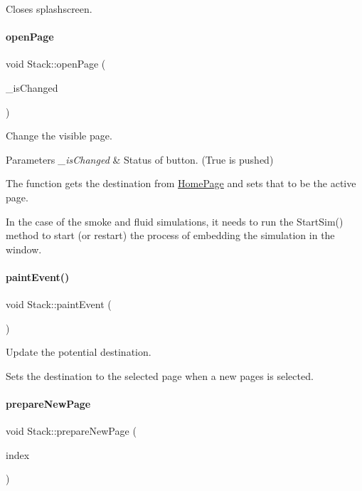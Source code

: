 Closes splashscreen. \mbox{\label{classStack_a3663db1c1578aabe63286d4f2bb6fc6f}} 
\paragraph{\texorpdfstring{openPage}{openPage}}
{\footnotesize\ttfamily void Stack\+::open\+Page (\begin{DoxyParamCaption}\item[{bool}]{\+\_\+is\+Changed }\end{DoxyParamCaption})\hspace{0.3cm}{\ttfamily [slot]}}

Change the visible page. 
\begin{DoxyParams}{Parameters}
{\em \+\_\+is\+Changed} & Status of button. (True is pushed)\\
\hline
\end{DoxyParams}
The function gets the destination from \mbox{\hyperlink{classHomePage}{Home\+Page}} and sets that to be the active page.

In the case of the smoke and fluid simulations, it needs to run the Start\+Sim() method to start (or restart) the process of embedding the simulation in the window. \mbox{\label{classStack_a58526db5899d5e03a6ad306a96f91d62}} 
\paragraph{\texorpdfstring{paintEvent()}{paintEvent()}}
{\footnotesize\ttfamily void Stack\+::paint\+Event (\begin{DoxyParamCaption}\item[{Q\+Paint\+Event $\ast$}]{ }\end{DoxyParamCaption})\hspace{0.3cm}{\ttfamily [protected]}}

Update the potential destination.

Sets the destination to the selected page when a new pages is selected. \mbox{\label{classStack_a836814b5492af3a0a4cc613d11b56397}} 
\paragraph{\texorpdfstring{prepareNewPage}{prepareNewPage}}
{\footnotesize\ttfamily void Stack\+::prepare\+New\+Page (\begin{DoxyParamCaption}\item[{int}]{index }\end{DoxyParamCaption})\hspace{0.3cm}{\ttfamily [slot]}}

